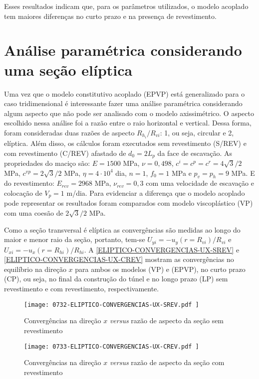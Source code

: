 Esses resultados indicam que, para os parâmetros utilizados, o modelo acoplado tem maiores diferenças no curto prazo e na presença de revestimento.

\section{Análise paramétrica considerando uma seção elíptica}

Uma vez que o modelo constitutivo acoplado (EPVP) está generalizado para o caso tridimensional é interessante fazer uma análise paramétrica considerando algum aspecto que não pode ser analisado com o modelo axissimétrico. O aspecto escolhido nessa análise foi a razão entre o raio horizontal e vertical. Dessa forma, foram consideradas duas razões de aspecto $R_{h_i}/R_{vi}$: 1, ou seja, circular e 2, elíptica. Além disso, os cálculos foram executados sem revestimento (S/REV) e com revestimento (C/REV) afastado de $d_0=2L_p$ da face de escavação. As propriedades do maciço são: $E=1500$ MPa, $\nu=0,498$, $c^i=c^p=c^r =4\sqrt{3}/2$ MPa, $c^{vp}=2\sqrt{3}/2$ MPa, $\eta = 4 \cdot 10^4$ dia, $n=1$, $f_0=1$ MPa e $p_v=p_h=9$ MPa. E do revestimento: $E_{rev}=2968$ MPa, $\nu_{rev}=0,3$ com uma velocidade de escavação e colocação de $V_p=1$ m/dia. Para evidenciar a diferença que o modelo acoplado pode representar os resultados foram comparados com modelo viscoplástico (VP) com uma coesão de $2\sqrt{3}/2$ MPa.

Como a seção transversal é elíptica as convergências são medidas ao longo do maior e menor raio da seção, portanto,  tem-se $U_{yi} = -u_y(r=R_{vi})/R_{vi}$ e $U_{xi} = -u_x(r=R_{hi})/R_{hi}$.  A \autoref{ELIPTICO-CONVERGENCIAS-UX-SREV} e \autoref{ELIPTICO-CONVERGENCIAS-UX-CREV} mostram as convergências no equilíbrio na direção $x$ para ambos os modelos (VP) e (EPVP), no curto prazo (CP), ou seja, no final da construção do túnel e no longo prazo (LP) sem revestimento e com revestimento, respectivamente.


\begin{figure}[H]
	\begin{center}
		\texttt{[image: 0732-ELIPTICO-CONVERGENCIAS-UX-SREV.pdf
		]}
	\end{center}
	\caption{\label{ELIPTICO-CONVERGENCIAS-UX-SREV}Convergências na direção $x$ \textit{versus} razão de aspecto da seção sem revestimento}
\end{figure}

\begin{figure}[H]
	\begin{center}
		\texttt{[image: 0733-ELIPTICO-CONVERGENCIAS-UX-CREV.pdf
		]}
	\end{center}
	\caption{\label{ELIPTICO-CONVERGENCIAS-UX-CREV}Convergências na direção $x$ \textit{versus} razão de aspecto da seção com revestimento}
\end{figure}

